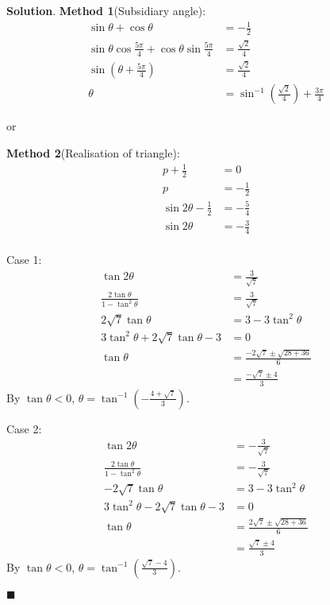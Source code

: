 \documentclass[12pt]{article}
\newenvironment*{sol}{\par \textbf{Solution}.}{\hfill$\blacksquare$}
\begin{document}
\begin{enumerate}
\begin{enumerate}
\begin{enumerate}
\begin{sol}
                    \textbf{Method 1}(Subsidiary angle):\begin{align*}
                        \sin{\theta}+\cos{\theta}&=-\frac{1}{2}\\
                        \sin{\theta}\cos{\frac{5\pi}{4}}+\cos{\theta}\sin{\frac{5\pi}{4}}&=\frac{\sqrt{2}}{4}\\
                        \sin(\theta+\frac{5\pi}{4})&=\frac{\sqrt{2}}{4}\\
                        \theta&=\sin^{-1}(\frac{\sqrt{2}}{4})+\frac{3\pi}{4}
                    \end{align*}

                    or

                    \textbf{Method 2}(Realisation of triangle):\begin{align*}
                        p+\frac{1}{2}&=0\\
                        p&=-\frac{1}{2}\\
                        \sin{2\theta}-\frac{1}{2}&=-\frac{5}{4}\\
                        \sin{2\theta}&=-\frac{3}{4}\\
                    \end{align*}

                    Case 1:
                    \begin{align*}
                        \tan{2\theta}&=\frac{3}{\sqrt{7}}\\
                        \frac{2\tan{\theta}}{1-\tan^2{\theta}}&=\frac{3}{\sqrt{7}}\\
                        2\sqrt{7}\tan{\theta}&=3-3\tan^2{\theta}\\
                        3\tan^2{\theta}+2\sqrt{7}\tan{\theta}-3&=0\\
                        \tan{\theta}&=\frac{-2\sqrt{7}\pm\sqrt{28+36}}{6}\\
                        &=\frac{-\sqrt{7}\pm 4}{3}
                    \end{align*}
                    By $\tan{\theta}<0$, $\theta=\tan^{-1}(-\frac{4+\sqrt{7}}{3})$.

                    Case 2:
                    \begin{align*}
                        \tan{2\theta}&=-\frac{3}{\sqrt{7}}\\
                        \frac{2\tan{\theta}}{1-\tan^2{\theta}}&=-\frac{3}{\sqrt{7}}\\
                        -2\sqrt{7}\tan{\theta}&=3-3\tan^2{\theta}\\
                        3\tan^2{\theta}-2\sqrt{7}\tan{\theta}-3&=0\\
                        \tan{\theta}&=\frac{2\sqrt{7}\pm\sqrt{28+36}}{6}\\
                        &=\frac{\sqrt{7}\pm 4}{3}
                    \end{align*}
                    By $\tan{\theta}<0$, $\theta=\tan^{-1}(\frac{\sqrt{7}-4}{3})$.


\end{sol}
\end{enumerate}
\end{enumerate}
\end{enumerate}
\end{document}
